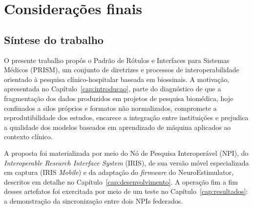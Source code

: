 
\chapter{Considerações finais}\label{cap:consideracoesFinais}

\section{Síntese do trabalho}\label{sec:sinteseTrabalho}

O presente trabalho propôs o Padrão de Rótulos e Interfaces para Sistemas Médicos (PRISM), um conjunto de diretrizes e processos de interoperabilidade orientado à pesquisa clínico-hospitalar baseada em biossinais. A motivação, apresentada no Capítulo~\ref{cap:introducao}, parte do diagnóstico de que a fragmentação dos dados produzidos em projetos de pesquisa biomédica, hoje confinados a silos próprios e formatos não normalizados, compromete a reprodutibilidade dos estudos, encarece a integração entre instituições e prejudica a qualidade dos modelos baseados em aprendizado de máquina aplicados ao contexto clínico.

A proposta foi materializada por meio do Nó de Pesquisa Interoperável (NPI), do \textit{Interoperable Research Interface System} (IRIS), de sua versão móvel especializada em captura (IRIS \textit{Mobile}) e da adaptação do \textit{firmware} do NeuroEstimulator, descritos em detalhe no Capítulo~\ref{cap:desenvolvimento}. A operação fim a fim desses artefatos foi exercitada por meio de um teste no Capítulo~\ref{cap:resultados}: a demonstração da sincronização entre dois NPIs federados.

